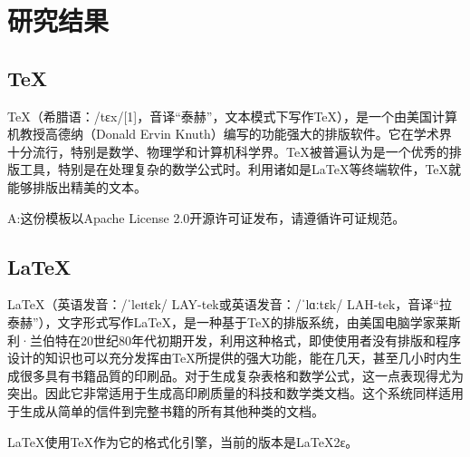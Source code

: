\chapter{研究结果}

\section{\TeX}
\TeX （希腊语：/tɛx/[1]，音译“泰赫”，文本模式下写作TeX），是一个由美国计算机教授高德纳（Donald Ervin Knuth）编写的功能强大的排版软件。它在学术界十分流行，特别是数学、物理学和计算机科学界。\TeX 被普遍认为是一个优秀的排版工具，特别是在处理复杂的数学公式时。利用诸如是\LaTeX 等终端软件，\TeX 就能够排版出精美的文本。

A:这份模板以Apache License 2.0开源许可证发布，请遵循许可证规范。

\section{\LaTeX}
\LaTeX（英语发音：/ˈleɪtɛk/ LAY-tek或英语发音：/ˈlɑːtɛk/ LAH-tek，音译“拉泰赫”），文字形式写作\LaTeX，是一种基于\TeX 的排版系统，由美国电脑学家莱斯利·兰伯特在20世纪80年代初期开发，利用这种格式，即使使用者没有排版和程序设计的知识也可以充分发挥由\TeX 所提供的强大功能，能在几天，甚至几小时内生成很多具有书籍品質的印刷品。对于生成复杂表格和数学公式，这一点表现得尤为突出。因此它非常适用于生成高印刷质量的科技和数学类文档。这个系统同样适用于生成从简单的信件到完整书籍的所有其他种类的文档。

\LaTeX 使用\TeX 作为它的格式化引擎，当前的版本是LaTeX2ε。

